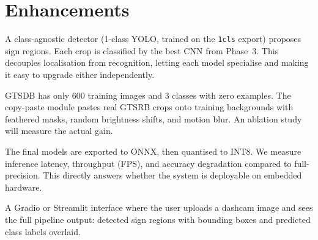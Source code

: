 \documentclass[12pt,a4paper]{article}
\begin{document}
\section*{Enhancements}

\begin{enhbox}[title={A1 : Detect-Then-Classify Pipeline}]
A class-agnostic detector (1-class YOLO, trained on the \texttt{1cls} export) proposes sign regions. Each crop is classified by the best CNN from Phase~3. This decouples localisation from recognition, letting each model specialise and making it easy to upgrade either independently.
\end{enhbox}

\begin{enhbox}[title={A2 : Synthetic Data Augmentation}]
GTSDB has only 600 training images and 3 classes with zero examples. The copy-paste module pastes real GTSRB crops onto training backgrounds with feathered masks, random brightness shifts, and motion blur. An ablation study will measure the actual gain.
\end{enhbox}

\begin{enhbox}[title={A3 : ONNX / INT8 Quantisation Benchmark}]
The final models are exported to ONNX, then quantised to INT8. We measure inference latency, throughput (FPS), and accuracy degradation compared to full-precision. This directly answers whether the system is deployable on embedded hardware.
\end{enhbox}

\begin{enhbox}[title={A6 : Web Demo (EF5)}]
A Gradio or Streamlit interface where the user uploads a dashcam image and sees the full pipeline output: detected sign regions with bounding boxes and predicted class labels overlaid.
\end{enhbox}
\end{document}
